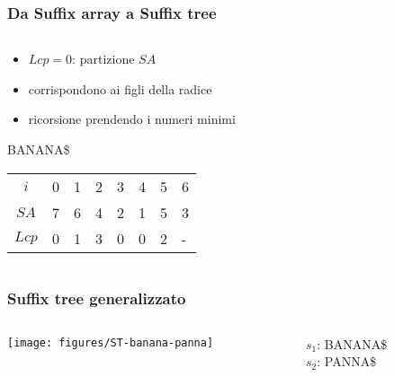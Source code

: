 \begin{frame}[fragile]
\frametitle{Da Suffix array a Suffix tree}
\begin{columns}
\begin{column}{0.5\textwidth}
\begin{itemize}[<+->]
\item
$Lcp = 0$:  partizione $SA$
\item
corrispondono ai figli della radice
\item
ricorsione prendendo i numeri minimi
\end{itemize}
\begin{block}{BANANA\$}
\begin{tabular}[l]{|c|l|l|l|l|l|l|l|}
\hline
$i$&0&1&2&3&4&5&6\\
$SA$&7&6&4&2&1&5&3\\
$Lcp$&0&1&3&0&0&2&-\\\hline
\end{tabular}
\end{block}
\end{column}
\begin{column}{0.5\textwidth}
\begin{center}
\end{center}
\end{column}
\end{columns}
\end{frame}



\begin{frame}
\frametitle{Suffix tree generalizzato}
\begin{columns}
\begin{column}{0.8\textwidth}
\begin{center}
\texttt{[image: figures/ST-banana-panna]}
\end{center}
\end{column}
\begin{column}{0.18\textwidth}
$s_{1}$: BANANA\$\\
$s_{2}$: PANNA\$
\end{column}
\end{columns}
\end{frame}


